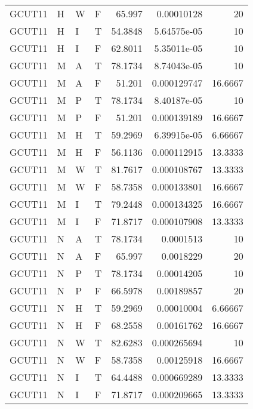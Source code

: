 \begin{table}[!htb]
{\begin{tabular}{llllrrr}
            GCUT11   & H     & W     & F          & 65.997     & 0.00010128  & 20       \\
            GCUT11   & H     & I     & T          & 54.3848    & 5.64575e-05 & 10       \\
            GCUT11   & H     & I     & F          & 62.8011    & 5.35011e-05 & 10       \\
            GCUT11   & M     & A     & T          & 78.1734    & 8.74043e-05 & 10       \\
            GCUT11   & M     & A     & F          & 51.201     & 0.000129747 & 16.6667  \\
            GCUT11   & M     & P     & T          & 78.1734    & 8.40187e-05 & 10       \\
            GCUT11   & M     & P     & F          & 51.201     & 0.000139189 & 16.6667  \\
            GCUT11   & M     & H     & T          & 59.2969    & 6.39915e-05 & 6.66667  \\
            GCUT11   & M     & H     & F          & 56.1136    & 0.000112915 & 13.3333  \\
            GCUT11   & M     & W     & T          & 81.7617    & 0.000108767 & 13.3333  \\
            GCUT11   & M     & W     & F          & 58.7358    & 0.000133801 & 16.6667  \\
            GCUT11   & M     & I     & T          & 79.2448    & 0.000134325 & 16.6667  \\
            GCUT11   & M     & I     & F          & 71.8717    & 0.000107908 & 13.3333  \\
            GCUT11   & N     & A     & T          & 78.1734    & 0.0001513   & 10       \\
            GCUT11   & N     & A     & F          & 65.997     & 0.0018229   & 20       \\
            GCUT11   & N     & P     & T          & 78.1734    & 0.00014205  & 10       \\
            GCUT11   & N     & P     & F          & 66.5978    & 0.00189857  & 20       \\
            GCUT11   & N     & H     & T          & 59.2969    & 0.00010004  & 6.66667  \\
            GCUT11   & N     & H     & F          & 68.2558    & 0.00161762  & 16.6667  \\
            GCUT11   & N     & W     & T          & 82.6283    & 0.000265694 & 10       \\
            GCUT11   & N     & W     & F          & 58.7358    & 0.00125918  & 16.6667  \\
            GCUT11   & N     & I     & T          & 64.4488    & 0.000669289 & 13.3333  \\
            GCUT11   & N     & I     & F          & 71.8717    & 0.000209665 & 13.3333  \\
            \hline
        \end{tabular}
    }{}
\end{table}